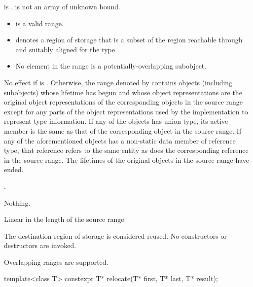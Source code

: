 \begin{itemdescr}
\pnum
\mandates
{} is .
 is not an array of unknown bound.

\pnum
\expects
\begin{itemize}
\item
   is a valid range.
\item
   denotes a region of storage that
  is a subset of the region reachable through 
  and suitably aligned for the type .
\item
  No element in the range  is a potentially-overlapping subobject.
\end{itemize}

\pnum
\ensures
No effect if  is .
Otherwise, the range denoted by 
contains objects (including subobjects) whose lifetime has begun and whose
object representations are the original object representations of the
corresponding objects in the source range  except
for any parts of the object representations used by the implementation to
represent type information. If any of the objects has
union type, its active member is the same as that of the corresponding object
in the source range. If any of the aforementioned objects has a non-static
data member of reference type, that reference refers to the same entity as
does the corresponding reference in the source range. The lifetimes of the
original objects in the source range have ended.

\pnum
\returns
{}.

\pnum
\throws
Nothing.

\pnum
\complexity
Linear in the length of the source range.

\pnum
\remarks
The destination region of storage is considered reused.
No constructors or destructors are invoked.

\begin{note}
Overlapping ranges are supported.
\end{note}
\end{itemdescr}

%
\begin{itemdecl}
template<class T>
  constexpr T* relocate(T* first, T* last, T* result);
\end{itemdecl}

